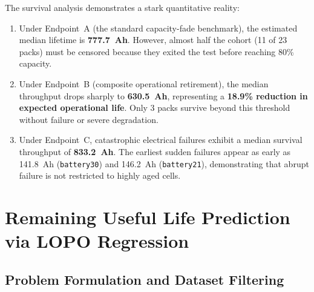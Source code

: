 \begin{table}[htbp]
  \centering
  \caption{Kaplan--Meier survival statistics across the three endpoint
  definitions for the primary cohort ($N = 23$).}
  \label{tab:km_results}
\end{table}

The survival analysis demonstrates a stark quantitative reality:
\begin{enumerate}
  \item Under Endpoint~A (the standard capacity-fade benchmark), the
  estimated median lifetime is \textbf{\SI{777.7}{Ah}}. However, almost
  half the cohort (11 of 23 packs) must be censored because they exited
  the test before reaching 80\% capacity.
  \item Under Endpoint~B (composite operational retirement), the median
  throughput drops sharply to \textbf{\SI{630.5}{Ah}}, representing a
  \textbf{18.9\% reduction in expected operational life}. Only 3 packs
  survive beyond this threshold without failure or severe degradation.
  \item Under Endpoint~C, catastrophic electrical failures exhibit a median
  survival throughput of \textbf{\SI{833.2}{Ah}}. The earliest sudden
  failures appear as early as \SI{141.8}{Ah} (\texttt{battery30}) and
  \SI{146.2}{Ah} (\texttt{battery21}), demonstrating that abrupt failure
  is not restricted to highly aged cells.
\end{enumerate}

\section{Remaining Useful Life Prediction via LOPO Regression}

\subsection{Problem Formulation and Dataset Filtering}

